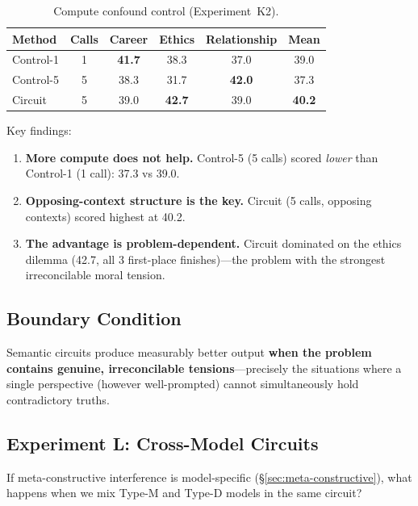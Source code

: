 \documentclass[11pt,a4paper]{article}
\begin{document}
\begin{table}[H]
\centering
\caption{Compute confound control (Experiment~K2).}
\begin{tabular}{lccccc}
\toprule
\textbf{Method} & \textbf{Calls} & \textbf{Career} & \textbf{Ethics} & \textbf{Relationship} & \textbf{Mean} \\
\midrule
Control-1 & 1 & \textbf{41.7} & 38.3 & 37.0 & 39.0 \\
Control-5 & 5 & 38.3 & 31.7 & \textbf{42.0} & 37.3 \\
Circuit   & 5 & 39.0 & \textbf{42.7} & 39.0 & \textbf{40.2} \\
\bottomrule
\end{tabular}
\label{tab:k2-results}
\end{table}

Key findings:
\begin{enumerate}
\item \textbf{More compute does not help.} Control-5 (5 calls) scored \emph{lower} than Control-1 (1 call): 37.3 vs 39.0.
\item \textbf{Opposing-context structure is the key.} Circuit (5 calls, opposing contexts) scored highest at 40.2.
\item \textbf{The advantage is problem-dependent.} Circuit dominated on the ethics dilemma (42.7, all 3 first-place finishes)---the problem with the strongest irreconcilable moral tension.
\end{enumerate}

\subsection{Boundary Condition}

Semantic circuits produce measurably better output \textbf{when the problem contains genuine, irreconcilable tensions}---precisely the situations where a single perspective (however well-prompted) cannot simultaneously hold contradictory truths.

\subsection{Experiment L: Cross-Model Circuits}
\label{sec:cross-model-circuits}

If meta-constructive interference is model-specific (\S\ref{sec:meta-constructive}), what happens when we mix Type-M and Type-D models in the same circuit?
\end{document}
